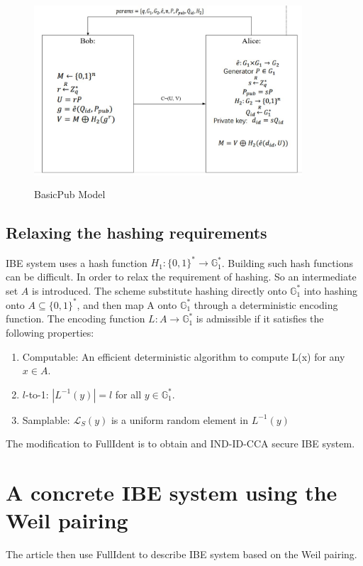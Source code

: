 \documentclass[runningheads,a4paper]{llncs}
\begin{document}
\begin{figure}[H]
\centering
\includegraphics[width=10cm, height=7cm]{basicpub.JPG}
\caption{BasicPub Model}
\end{figure}

\subsection{Relaxing the hashing requirements}
IBE system uses a hash function $H_1:\{0,1\}^*\rightarrow\mathbb{G}_1^*$. Building such hash functions can be difficult. In order to relax the requirement of hashing. So an intermediate set $A$ is introduced. The scheme substitute hashing directly onto $\mathbb{G}_1^*$ into hashing onto $A\subseteq\{0,1\}^*$, and then map A onto $\mathbb{G}_1^*$ through a deterministic encoding function. 
The encoding function $L:A\rightarrow\mathbb{G}_1^*$ is admissible if it satisfies the following properties:
\begin{enumerate}
	\item Computable: An efficient deterministic algorithm to compute L(x) for any $x\in A$.
	\item $l$-to-1: $|L^{-1}(y)|=l$ for all $y\in \mathbb{G}_1^*$.
	\item Samplable: $\mathcal{L}_S(y)$ is a uniform random element in $L^{-1}(y)$
\end{enumerate}
The modification to FullIdent is to obtain and IND-ID-CCA secure IBE system. 
 
\section{A concrete IBE system using the Weil pairing}
The article then use FullIdent to describe IBE system based on the Weil pairing. 
\end{document}
